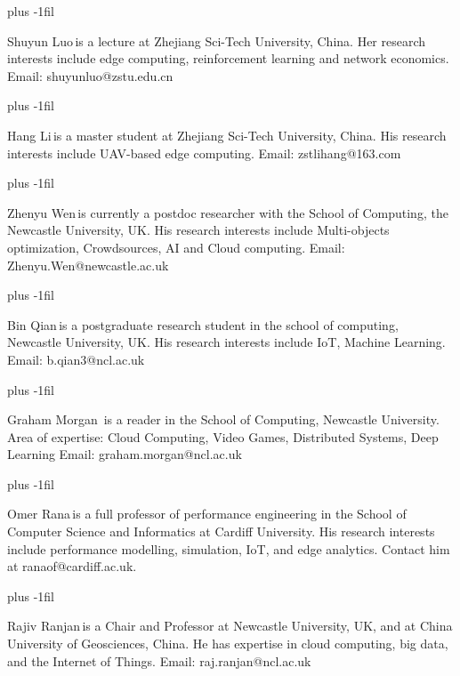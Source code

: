\baselineskip plus -1fil
\begin{IEEEbiographynophoto}{Shuyun Luo}{\,}is a lecture at Zhejiang Sci-Tech University, China. 
Her research interests include edge computing, reinforcement learning and network economics.
Email: shuyunluo@zstu.edu.cn
\end{IEEEbiographynophoto}
\baselineskip plus -1fil
\begin{IEEEbiographynophoto}{Hang Li}{\,}is a master student at Zhejiang Sci-Tech University, China.
His research interests include UAV-based edge computing. 
Email: zstlihang@163.com
\end{IEEEbiographynophoto}
\baselineskip plus -1fil
\begin{IEEEbiographynophoto}{Zhenyu Wen}{\,}is currently a postdoc researcher with the School of Computing, the Newcastle University, UK.
His research interests include Multi-objects optimization, Crowdsources, AI and Cloud computing.
Email: Zhenyu.Wen@newcastle.ac.uk
\end{IEEEbiographynophoto}
\baselineskip plus -1fil
\begin{IEEEbiographynophoto}{Bin Qian}{\,}is a postgraduate research student in the school of computing, Newcastle University, UK.
His research interests include IoT, Machine Learning. 
Email: b.qian3@ncl.ac.uk
\end{IEEEbiographynophoto}
\baselineskip plus -1fil
\begin{IEEEbiographynophoto}{Graham Morgan}{\,} is a reader in the School of Computing, Newcastle University. Area of expertise: Cloud Computing, Video Games, Distributed Systems, Deep Learning
Email: graham.morgan@ncl.ac.uk
\end{IEEEbiographynophoto}
\baselineskip plus -1fil
\begin{IEEEbiographynophoto}{Omer Rana}{\,}is a full professor of performance engineering in the School of Computer Science and Informatics at Cardiff University. His research interests include performance modelling, simulation, IoT, and edge
analytics. Contact him at ranaof@cardiff.ac.uk. 
\end{IEEEbiographynophoto}
\baselineskip plus -1fil
\begin{IEEEbiographynophoto}{Rajiv Ranjan}{\,}is a Chair and Professor at Newcastle University, UK, and at China University of Geosciences, China.
He has expertise in cloud computing, big data, and the Internet of Things.
Email: raj.ranjan@ncl.ac.uk
\end{IEEEbiographynophoto}

